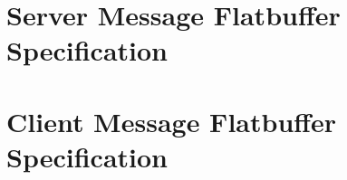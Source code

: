 \documentclass[11pt, oneside]{amsart}
\begin{document}


\section{Server Message Flatbuffer Specification}


\section{Client Message Flatbuffer Specification}

\end{document}
